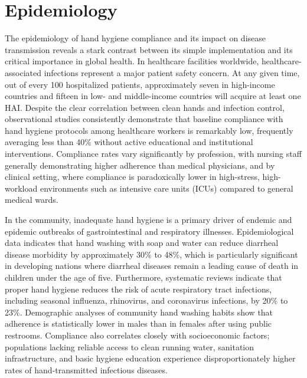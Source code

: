 \section*{Epidemiology}
The epidemiology of hand hygiene compliance and its impact on disease transmission reveals a stark contrast between its simple implementation and its critical importance in global health. In healthcare facilities worldwide, healthcare-associated infections represent a major patient safety concern. At any given time, out of every 100 hospitalized patients, approximately seven in high-income countries and fifteen in low- and middle-income countries will acquire at least one HAI. Despite the clear correlation between clean hands and infection control, observational studies consistently demonstrate that baseline compliance with hand hygiene protocols among healthcare workers is remarkably low, frequently averaging less than 40\% without active educational and institutional interventions. Compliance rates vary significantly by profession, with nursing staff generally demonstrating higher adherence than medical physicians, and by clinical setting, where compliance is paradoxically lower in high-stress, high-workload environments such as intensive care units (ICUs) compared to general medical wards.

In the community, inadequate hand hygiene is a primary driver of endemic and epidemic outbreaks of gastrointestinal and respiratory illnesses. Epidemiological data indicates that hand washing with soap and water can reduce diarrheal disease morbidity by approximately 30\% to 48\%, which is particularly significant in developing nations where diarrheal diseases remain a leading cause of death in children under the age of five. Furthermore, systematic reviews indicate that proper hand hygiene reduces the risk of acute respiratory tract infections, including seasonal influenza, rhinovirus, and coronavirus infections, by 20\% to 23\%. Demographic analyses of community hand washing habits show that adherence is statistically lower in males than in females after using public restrooms. Compliance also correlates closely with socioeconomic factors; populations lacking reliable access to clean running water, sanitation infrastructure, and basic hygiene education experience disproportionately higher rates of hand-transmitted infectious diseases.

